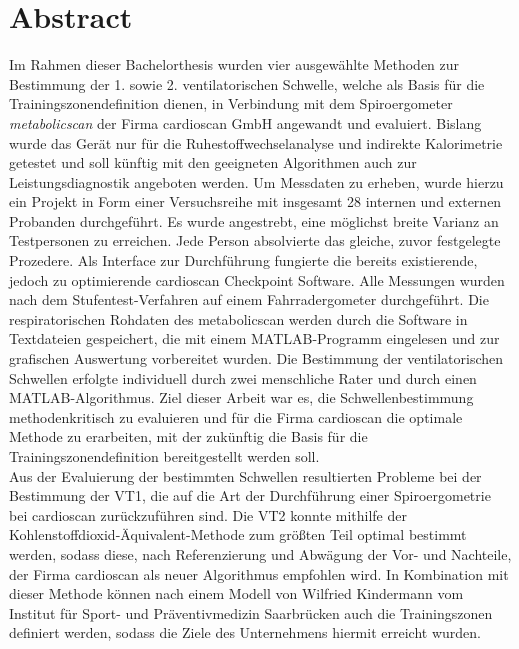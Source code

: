 \chapter*{Abstract}

Im Rahmen dieser Bachelorthesis wurden vier ausgewählte Methoden zur Bestimmung der 1. sowie 2. ventilatorischen Schwelle, welche als Basis für die Trainingszonendefinition dienen, in Verbindung mit dem Spiroergometer \textsl{metabolicscan} der Firma cardioscan GmbH angewandt und evaluiert. Bislang wurde das Gerät nur für die Ruhestoffwechselanalyse und indirekte Kalorimetrie getestet und soll künftig mit den geeigneten Algorithmen auch zur Leistungsdiagnostik angeboten werden. Um Messdaten zu erheben, wurde hierzu ein Projekt in Form einer Versuchsreihe mit insgesamt 28 internen und externen Probanden durchgeführt. Es wurde angestrebt, eine möglichst breite Varianz an Testpersonen zu erreichen. Jede Person absolvierte das gleiche, zuvor festgelegte Prozedere. Als Interface zur Durchführung fungierte die bereits existierende, jedoch zu optimierende cardioscan Checkpoint Software. Alle Messungen wurden nach dem Stufentest-Verfahren auf einem Fahrradergometer durchgeführt. Die respiratorischen Rohdaten des metabolicscan werden durch die Software in Textdateien gespeichert, die mit einem MATLAB-Programm eingelesen und zur grafischen Auswertung vorbereitet wurden. Die Bestimmung der ventilatorischen Schwellen erfolgte individuell durch zwei menschliche Rater und durch einen MATLAB-Algorithmus. Ziel dieser Arbeit war es, die Schwellenbestimmung methodenkritisch zu evaluieren und für die Firma cardioscan die optimale Methode zu erarbeiten, mit der zukünftig die Basis für die Trainingszonendefinition bereitgestellt werden soll.\\
Aus der Evaluierung der bestimmten Schwellen resultierten Probleme bei der Bestimmung der VT1, die auf die Art der Durchführung einer Spiroergometrie bei cardioscan zurückzuführen sind. Die VT2 konnte mithilfe der Kohlenstoffdioxid-Äquivalent-Methode zum größten Teil optimal bestimmt werden, sodass diese, nach Referenzierung und Abwägung der Vor- und Nachteile, der Firma cardioscan als neuer Algorithmus empfohlen wird. In Kombination mit dieser Methode können nach einem Modell von Wilfried Kindermann vom Institut für Sport- und Präventivmedizin Saarbrücken auch die Trainingszonen definiert werden, sodass die Ziele des Unternehmens hiermit erreicht wurden.
